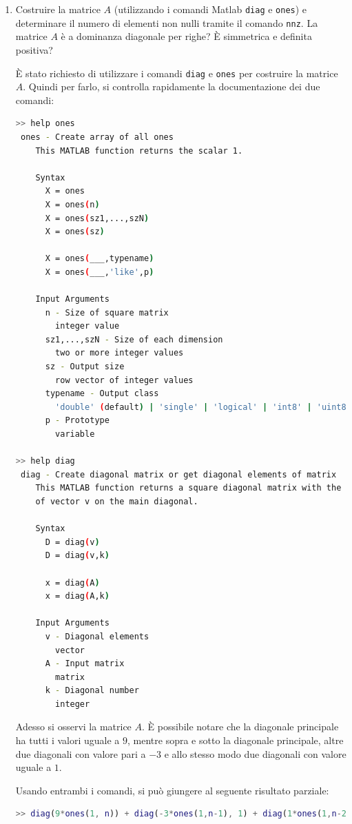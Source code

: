 \begin{enumerate}
    \item Costruire la matrice $A$ (utilizzando i comandi Matlab \texttt{diag} e \texttt{ones}) e determinare il numero di elementi non nulli tramite il comando \texttt{nnz}. La matrice $A$ è a dominanza diagonale per righe? È simmetrica e definita positiva?
    
    È stato richiesto di utilizzare i comandi \texttt{diag} e \texttt{ones} per costruire la matrice $A$. Quindi per farlo, si controlla rapidamente la documentazione dei due comandi:
    \begin{lstlisting}[language=bash]
>> help ones
 ones - Create array of all ones
    This MATLAB function returns the scalar 1.

    Syntax
      X = ones
      X = ones(n)
      X = ones(sz1,...,szN)
      X = ones(sz)

      X = ones(___,typename)
      X = ones(___,'like',p)

    Input Arguments
      n - Size of square matrix
        integer value
      sz1,...,szN - Size of each dimension
        two or more integer values
      sz - Output size
        row vector of integer values
      typename - Output class
        'double' (default) | 'single' | 'logical' | 'int8' | 'uint8' | ...
      p - Prototype
        variable

>> help diag
 diag - Create diagonal matrix or get diagonal elements of matrix
    This MATLAB function returns a square diagonal matrix with the elements
    of vector v on the main diagonal.

    Syntax
      D = diag(v)
      D = diag(v,k)

      x = diag(A)
      x = diag(A,k)

    Input Arguments
      v - Diagonal elements
        vector
      A - Input matrix
        matrix
      k - Diagonal number
        integer\end{lstlisting}
    Adesso si osservi la matrice $A$. È possibile notare che la diagonale principale ha tutti i valori uguale a $9$, mentre sopra e sotto la diagonale principale, altre due diagonali con valore pari a $-3$ e allo stesso modo due diagonali con valore uguale a $1$.

    Usando entrambi i comandi, si può giungere al seguente risultato parziale:
    \begin{lstlisting}[language=MATLAB]
>> diag(9*ones(1, n)) + diag(-3*ones(1,n-1), 1) + diag(1*ones(1,n-2), 2)


\end{lstlisting}
\end{enumerate}
